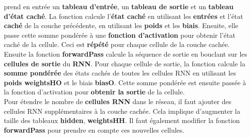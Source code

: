 \begin{enumerate}
{    prend en entrée un \textbf{tableau d'entrée}, un \textbf{tableau de sortie} et un \textbf{tableau d'état caché}. La fonction calcule l'\textbf{état caché} en utilisant les \textbf{entrées} et l'état \textbf{caché}
    de la couche précédente, en utilisant les \textbf{poids} et les \textbf{biais}. Ensuite, elle passe cette somme pondérée à une \textbf{fonction d'activation} pour obtenir l'état caché de la cellule. Ceci est \textbf{répété} pour chaque 
    cellule de la couche cachée. \\
    Ensuite la fonction \textbf{forwardPass} calcule la séquence de sortie en bouclant sur les \textbf{cellules de sortie} du \textbf{RNN}. Pour chaque cellule de sortie, la fonction calcule la \textbf{somme pondérée} des états
    cachés de toutes les cellules RNN en utilisant les \textbf{poids weightsHO} et le biais \textbf{biasO}. Cette somme pondérée est ensuite passée à la fonction d'activation pour \textbf{obtenir la sortie} de la cellule. \\
    
    Pour étendre le nombre de \textbf{cellules RNN} dans le réseau, il faut ajouter des cellules RNN supplémentaires à la couche cachée. Cela implique d'augmenter la taille des tableaux \textbf{hidden}, \textbf{weightsHH}.
    Il faut également modifier la fonction \textbf{forwardPass} pour prendre en compte ces nouvelles cellules.
  }
\end{enumerate}